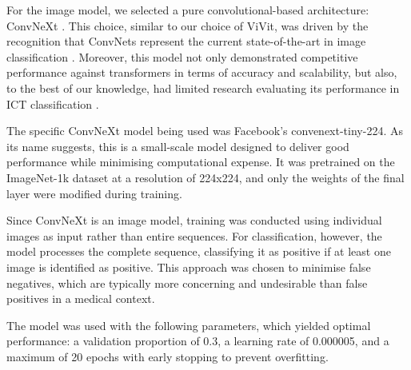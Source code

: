 For the image model, we selected a pure convolutional-based architecture: ConvNeXt \cite{convnextbro}. This choice, similar to our choice of ViVit, was driven by the recognition that ConvNets represent the current state-of-the-art in image classification \cite{convnextbro}. Moreover, this model not only demonstrated competitive performance against transformers in terms of accuracy and scalability, but also, to the best of our knowledge, had limited research evaluating its performance in ICT classification \cite{convnextbro}.

The specific ConvNeXt model being used was Facebook’s convenext-tiny-224. As its name suggests, this is a small-scale model designed to deliver good performance while minimising computational expense. It was pretrained on the ImageNet-1k dataset at a resolution of 224x224, and only the weights of the final layer were modified during training.

Since ConvNeXt is an image model, training was conducted using individual images as input rather than entire sequences. For classification, however, the model processes the complete sequence, classifying it as positive if at least one image is identified as positive. This approach was chosen to minimise false negatives, which are typically more concerning and undesirable than false positives in a medical context.

The model was used with the following parameters, which yielded optimal performance: a validation proportion of 0.3, a learning rate of 0.000005, and a maximum of 20 epochs with early stopping to prevent overfitting.